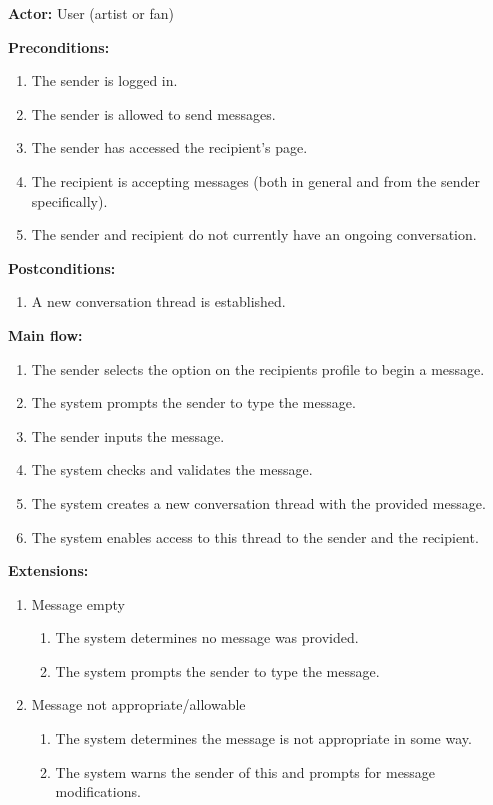 \documentclass{article}
\begin{document}
{\bfseries Actor:} User (artist or fan)

{\bfseries Preconditions:}
\begin{enumerate}
	\item The sender is logged in.
	\item The sender is allowed to send messages.
	\item The sender has accessed the recipient's page.
	\item The recipient is accepting messages (both in general and from the sender specifically).
	\item The sender and recipient do not currently have an ongoing conversation.
\end{enumerate}

{\bfseries Postconditions:}
\begin{enumerate}
	\item A new conversation thread is established.
\end{enumerate}

{\bfseries Main flow:}
\begin{enumerate}
	\item The sender selects the option on the recipients profile to begin a message.
	\item The system prompts the sender to type the message.
	\item The sender inputs the message.
	\item The system checks and validates the message.
	\item The system creates a new conversation thread with the provided message.
	\item The system enables access to this thread to the sender and the recipient.
\end{enumerate}

{\bfseries Extensions:}
\begin{enumerate}
	\item [4a.] Message empty
	\begin{enumerate}
		\item [4a1.] The system determines no message was provided.
		\item [4a2.] The system prompts the sender to type the message.
	\end{enumerate}
	\item[4b.] Message not appropriate/allowable
	\begin{enumerate}
		\item [4b1.] The system determines the message is not appropriate in some way.
		\item [4b2.] The system warns the sender of this and prompts for message modifications.
	\end{enumerate}
\end{enumerate}
\end{document}
